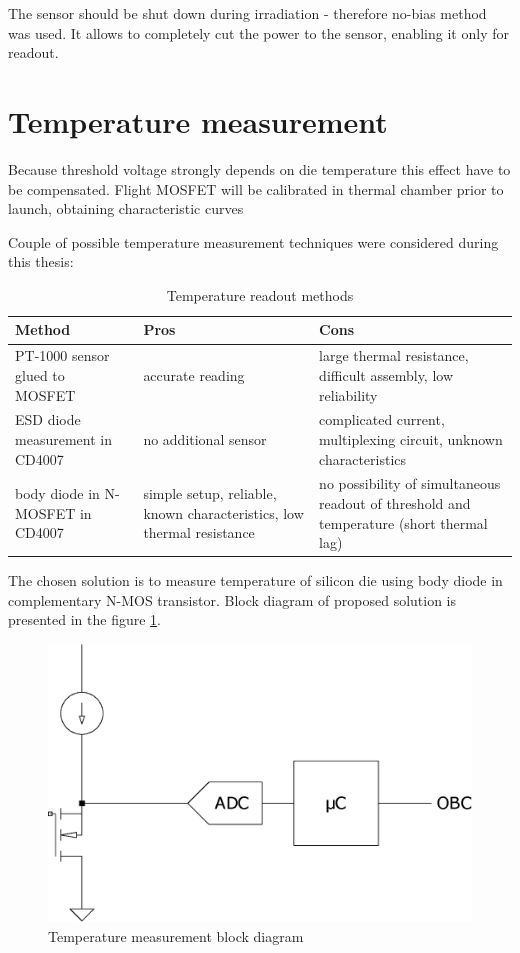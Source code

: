     The sensor should be shut down during irradiation - therefore no-bias method was used. It allows to completely cut the power to the sensor, enabling it only for readout.

\section{Temperature measurement}
    Because threshold voltage strongly depends on die temperature this effect have to be compensated. Flight MOSFET will be calibrated in thermal chamber prior to launch, obtaining characteristic curves

    Couple of possible temperature measurement techniques were considered during this thesis:
    \begin{table}[H]
    \begin{tabular}{R{4.5cm} | C{5cm} | C{5cm} }
        Method & Pros & Cons \\ \hline

        PT-1000 sensor glued to MOSFET & accurate reading & large thermal resistance, difficult assembly, low reliability \\ \hline

        ESD diode measurement in CD4007 & no additional sensor & complicated current, multiplexing circuit, unknown characteristics \\ \hline

        body diode in N-MOSFET in CD4007  & simple setup, reliable, known characteristics, low thermal resistance & no possibility of simultaneous readout of threshold and temperature (short thermal lag)
    \end{tabular}
    \caption{Temperature readout methods}
    \end{table}

    The chosen solution is to measure temperature of silicon die using body diode in complementary N-MOS transistor. Block diagram of proposed solution is presented in the figure \ref{Temperature_measurement_block_diagram}.

    \begin{figure}[H]
        \centering
        \includegraphics[width=0.3\paperwidth]{img/05/n-mos-temperature.eps}
        \caption{Temperature measurement block diagram}
        \label{Temperature_measurement_block_diagram}
    \end{figure}

